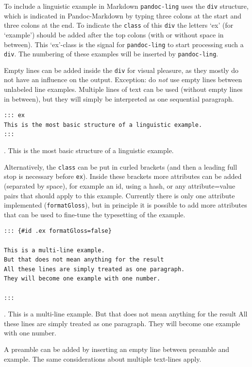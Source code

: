 \documentclass[
]{article}
\begin{document}
To include a linguistic example in Markdown \texttt{pandoc-ling} uses
the \texttt{div} structure, which is indicated in Pandoc-Markdown by
typing three colons at the start and three colons at the end. To
indicate the \texttt{class} of this \texttt{div} the letters `ex' (for
`example') should be added after the top colons (with or without space
in between). This `ex'-class is the signal for \texttt{pandoc-ling} to
start processing such a \texttt{div}. The numbering of these examples
will be inserted by \texttt{pandoc-ling}.

Empty lines can be added inside the \texttt{div} for visual pleasure, as
they mostly do not have an influence on the output. Exception: do
\emph{not} use empty lines between unlabeled line examples. Multiple
lines of text can be used (without empty lines in between), but they
will simply be interpreted as one sequential paragraph.

\begin{verbatim}
::: ex
This is the most basic structure of a linguistic example. 
:::
\end{verbatim}

\ex. \label{ling-ex:4.1} 
  This is the most basic structure of a linguistic example.

Alternatively, the \texttt{class} can be put in curled brackets (and
then a leading full stop is necessary before \texttt{ex}). Inside these
brackets more attributes can be added (separated by space), for example
an id, using a hash, or any attribute=value pairs that should apply to
this example. Currently there is only one attribute implemented
(\texttt{formatGloss}), but in principle it is possible to add more
attributes that can be used to fine-tune the typesetting of the example.

\begin{verbatim}
::: {#id .ex formatGloss=false}

This is a multi-line example.
But that does not mean anything for the result
All these lines are simply treated as one paragraph.
They will become one example with one number.

:::
\end{verbatim}

\ex. \label{id} 
  This is a multi-line example. But that does not mean anything for the
result All these lines are simply treated as one paragraph. They will
become one example with one number.

A preamble can be added by inserting an empty line between preamble and
example. The same considerations about multiple text-lines apply.
\end{document}
